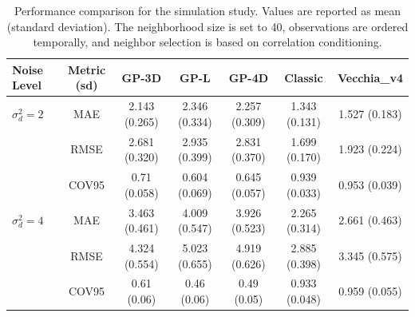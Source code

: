 \documentclass[12pt]{article}
\begin{document}
\noindent
\hangindent=-5mm
\begin{table}[h]
    \centering
    \scriptsize 
    \renewcommand{\arraystretch}{1.2} 
    \setlength{\tabcolsep}{5pt} 
    \begin{tabular}{l|c|c|c|c|c|c}
        \toprule
        \textbf{Noise Level} & \textbf{Metric (sd)} & \textbf{GP-3D} & \textbf{GP-L} & \textbf{GP-4D} & \textbf{Classic} & \textbf{Vecchia\_v4} \\
        \midrule
        $\sigma_{d}^2=2$ 
        & MAE  
        & 2.143 (0.265) 
        & 2.346 (0.334) 
        & 2.257 (0.309) 
        & \cellcolor{green!40}1.343 (0.131) 
        & \cellcolor{yellow!40}1.527 (0.183) \\
        
        & RMSE 
        & 2.681 (0.320) 
        & 2.935 (0.399) 
        & 2.831 (0.370) 
        & \cellcolor{green!40}1.699 (0.170) 
        & \cellcolor{yellow!40}1.923 (0.224) \\
        
        & COV95 
        & 0.71 (0.058)     
        & 0.604 (0.069)     
        & 0.645 (0.057)       
        & 0.939 (0.033) 
        & \cellcolor{green!40}0.953 (0.039) \\
        
        \midrule
        
        $\sigma_{d}^2=4$ 
        & MAE  
        & 3.463 (0.461) 
        & 4.009 (0.547) 
        & 3.926 (0.523) 
        & \cellcolor{green!40}2.265 (0.314) 
        & \cellcolor{yellow!40}2.661 (0.463) \\
        
        & RMSE 
        & 4.324 (0.554) 
        & 5.023 (0.655) 
        & 4.919 (0.626) 
        & \cellcolor{green!40}2.885 (0.398) 
        & \cellcolor{yellow!40}3.345 (0.575) \\
        
        & COV95 
        & 0.61 (0.06)
        & 0.46 (0.06)
        & 0.49  (0.05)
        & 0.933 (0.048) 
        & \cellcolor{green!40}0.959 (0.055) \\
        
        \bottomrule
    \end{tabular}
    \caption{Performance comparison for the simulation study. Values are reported as mean (standard deviation). The neighborhood size is set to 40, observations are ordered temporally, and neighbor selection is based on correlation conditioning.}
    \label{tab:vecchia_performance_updated}
\end{table}
\end{document}
